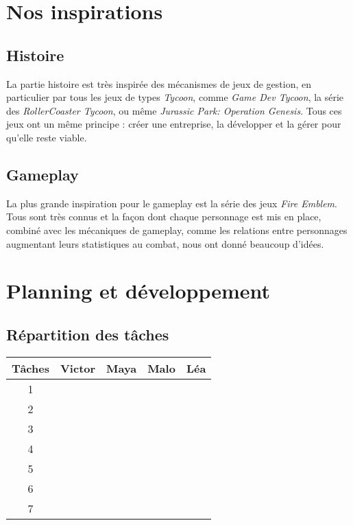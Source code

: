 \documentclass{article}
\begin{document}
\section{Nos inspirations}
\subsection{Histoire}
La partie histoire est très inspirée des mécanismes de jeux de gestion, en particulier par tous les jeux de types \textit{Tycoon}, comme \textit{Game Dev Tycoon}, la série des \textit{RollerCoaster Tycoon}, ou même \textit{Jurassic Park: Operation Genesis}. Tous ces jeux ont un même principe : créer une entreprise, la développer et la gérer pour qu'elle reste viable.
\subsection{Gameplay}
La plus grande inspiration pour le gameplay est la série des jeux \textit{Fire Emblem}. Tous sont très connus et la façon dont chaque personnage est mis en place, combiné avec les mécaniques de gameplay, comme les relations entre personnages augmentant leurs statistiques au combat, nous ont donné beaucoup d'idées.

\section{Planning et développement}
\subsection{Répartition des tâches}
\begin{center}
	\begin{tabular}{|c||c|c|c|c|}
	\hline
    \textbf{Tâches} & \textbf{Victor} & \textbf{Maya} & \textbf{Malo} & \textbf{Léa} \\ \hline
    1 & & & & \\ \hline
    2 &  &  &  & \\ \hline
    3 &  & &  & \\ \hline
    4 & & & & \\ \hline
    5 & & & &\\ \hline
    6 &  & & &\\ \hline
    7 &  &  & &\\ 
    \hline
	\end{tabular}
\end{center}
\end{document}
